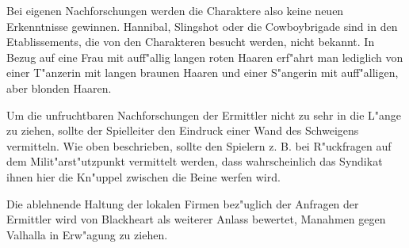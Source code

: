 Bei eigenen Nachforschungen werden die Charaktere also keine neuen Erkenntnisse gewinnen. Hannibal, Slingshot oder die Cowboybrigade sind in den Etablissements, die von den Charakteren besucht werden, nicht bekannt. In Bezug auf eine Frau mit auff"allig langen roten Haaren erf"ahrt man lediglich von einer T"anzerin mit langen braunen Haaren und einer S"angerin mit auff"alligen, aber blonden Haaren.

\begin{remarks}
	Um die unfruchtbaren Nachforschungen der Ermittler nicht zu sehr in die L"ange zu ziehen, sollte der Spielleiter den Eindruck einer Wand des Schweigens vermitteln. Wie oben beschrieben, sollte den Spielern z. B. bei R"uckfragen auf dem Milit"arst"utzpunkt vermittelt werden, dass wahrscheinlich das Syndikat ihnen hier die Kn"uppel zwischen die Beine werfen wird.

	Die ablehnende Haltung der lokalen Firmen bez"uglich der Anfragen der Ermittler wird von Blackheart als weiterer Anlass bewertet, Ma\3nahmen gegen Valhalla in Erw"agung zu ziehen.
\end{remarks}
